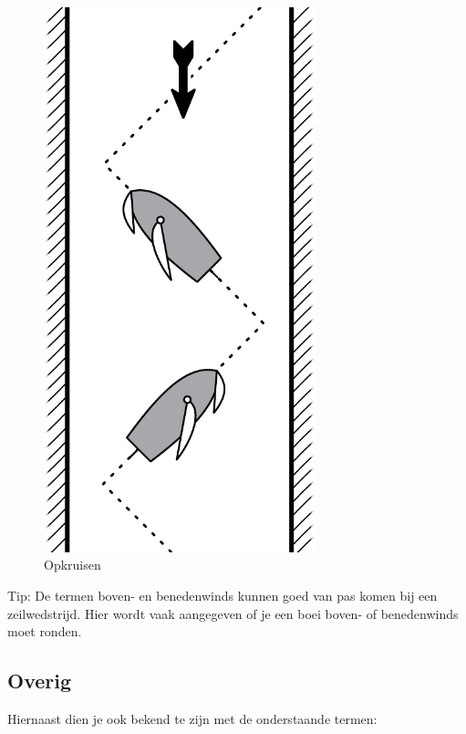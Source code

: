 \begin{figure}[h]
\begin{minipage}[b]{0.29\textwidth}
    \includegraphics[width=0.7\textwidth]{Hoofdstukken/Onderdelen/pdf/opkruisen.pdf}
    \caption{Opkruisen}
    \label{pic:opkruisen}
  \end{minipage}
\end{figure}



Tip: De termen boven- en benedenwinds kunnen goed van pas komen bij een zeilwedstrijd. Hier wordt vaak aangegeven of je een boei boven- of benedenwinds moet ronden.

\newpage
\subsection{Overig}
Hiernaast dien je ook bekend te zijn met de onderstaande termen:

